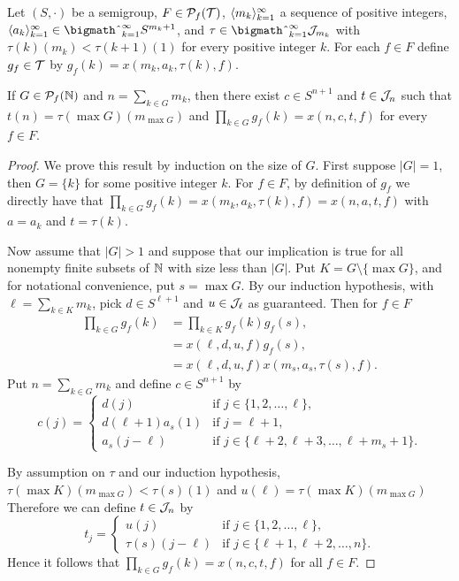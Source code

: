 \begin{lem}
  Let $(S, \cdot)$ be a semigroup, $F \in \mathcal{P}_f(\mathcal{T})$, $\langle m_k \rangle_{k=1}^\infty$ a sequence of positive integers, $\la a_k \ra_{k=1}^\infty \in \bigtimes_{k=1}^\infty S^{m_k + 1}$, and $\tau \in \bigtimes_{k=1}^\infty \calJ_{m_k}$ with $\tau(k)(m_k) < \tau(k+1)(1)$ for every positive integer $k$.
  For each $f \in F$ define $g_f \in \mathcal{T}$ by $g_f(k) = x(m_k, a_k, \tau(k), f)$.

  If $G \in \mathcal{P}_f(\mathbb{N})$ and $n = \sum_{k \in G} m_k$, then there exist $c \in S^{n+1}$ and $t \in \mathcal{J}_n$ such that $t(n) = \tau(\max G)(m_{\max G})$ and $\prod_{k \in G} g_f(k) = x(n, c, t, f)$ for every $f \in F$.
\end{lem}
\begin{proof}
  We prove this result by induction on the size of $G$.
  First suppose $|G| = 1$, then $G = \{k\}$ for some positive integer $k$.
  For $f \in F$, by definition of $g_f$ we directly have that $\prod_{k \in G} g_f(k) = x(m_k, a_k, \tau(k), f) = x(n, a, t, f)$ with $a = a_k$ and $t = \tau(k)$.

  Now assume that $|G| > 1$ and suppose that our implication is true for all nonempty finite subsets of $\mathbb{N}$ with size less than $|G|$.
  Put $K = G \setminus \{\max G\}$, and for notational convenience, put $s = \max G$.
  By our induction hypothesis, with $\ell = \sum_{k \in K} m_k$, pick $d \in S^{\ell+1}$ and $u \in \mathcal{J}_\ell$ as guaranteed.
  Then for $f \in F$
  \begin{align*}
    \textstyle
    \prod_{k \in G} g_f(k) &= \textstyle \prod_{k \in K} g_f(k) g_f(s), \\
                         &= x(\ell, d, u, f) g_f(s), \\
                         &= x(\ell, d, u, f) x(m_s, a_s, \tau(s), f).
  \end{align*}
  Put $n = \sum_{k \in G} m_k$ and define $c \in S^{n+1}$ by 
  \[
    c(j) =
    \begin{cases}
      d(j) & \mbox{if $j \in \{1, 2, \ldots, \ell\}$,} \\
      d(\ell+1)a_s(1) & \mbox{if $j = \ell+1$,} \\
      a_s(j - \ell) & \mbox{if $j \in \{\ell+2, \ell+3, \ldots, \ell+m_s+1\}$.}
    \end{cases}
  \]
  
  By assumption on $\tau$ and our induction hypothesis, $\tau(\max K)(m_{\max G}) < \tau(s)(1)$ and $u(\ell) = \tau(\max K)(m_{\max G})$
  Therefore we can define $t \in \mathcal{J}_n$ by
  \[
    t_j =
    \begin{cases}
      u(j) & \mbox{if $j \in \{1, 2, \ldots, \ell\}$,} \\
      \tau(s)(j-\ell) & \mbox{if $j \in \{\ell+1, \ell+2, \ldots, n\}$.}
    \end{cases}
  \]
  Hence it follows that $\prod_{k \in G} g_f(k) = x(n, c, t, f)$ for all $f \in F$.
\end{proof}

